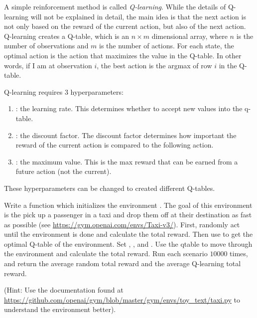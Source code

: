 A simple reinforcement method is called \emph{Q-learning}.
While the details of Q-learning will not be explained in detail, the main idea is that the next action is not only based on the reward of the current action, but also of the next action.
Q-learning creates a Q-table, which is an $n\times m$ dimensional array, where $n$ is the number of observations and $m$ is the number of actions.
For each state, the optimal action is the action that maximizes the value in the Q-table.
In other words, if I am at observation $i$, the best action is the argmax of row $i$ in the Q-table.

Q-learning requires 3 hyperparameters:
\begin{enumerate}
\item {}: the learning rate. This determines whether to accept new values into the q-table.
\item {}: the discount factor. The discount factor determines how important the reward of the current action is compared to the following action.
\item {}: the maximum value. This is the max reward that can be earned from a future action (not the current).
\end{enumerate}
These hyperparameters can be changed to created different Q-tables.

\begin{problem}
Write a function  which initializes the environment .
The goal of this environment is the pick up a passenger in a taxi and drop them off at their destination as fast as possible (see \url{https://gym.openai.com/envs/Taxi-v3/}).
First, randomly act until the environment is done and calculate the total reward.
Then use  to get the optimal Q-table of the environment.
Set , , and .
Use the qtable to move through the environment and calculate the total reward.
Run each scenario $10000$ times, and return the average random total reward and the average Q-learning total reward.

(Hint: Use the documentation found at \url{https://github.com/openai/gym/blob/master/gym/envs/toy_text/taxi.py} to understand the environment better).
\label{prob:taxi}
\end{problem}






